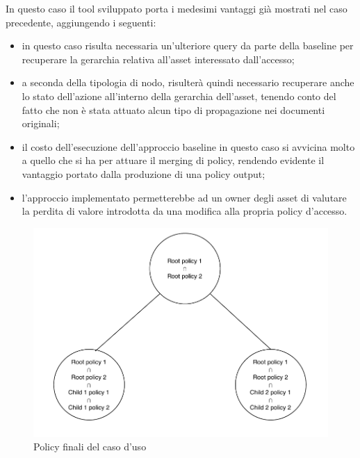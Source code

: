 \documentclass[12pt,a4paper,twoside]{book}
\begin{document}
In questo caso il tool sviluppato porta i medesimi vantaggi già mostrati nel caso precedente, aggiungendo i seguenti:
\begin{itemize}
\item in questo caso risulta necessaria un'ulteriore query da parte della baseline per recuperare la gerarchia relativa all'asset interessato dall'accesso;
\item a seconda della tipologia di nodo, risulterà quindi necessario recuperare anche lo stato dell'azione all'interno della gerarchia dell'asset, tenendo conto del fatto che non è stata attuato alcun tipo di propagazione nei documenti originali;
\item il costo dell'esecuzione dell'approccio baseline in questo caso si avvicina molto a quello che si ha per attuare il merging di policy, rendendo evidente il vantaggio portato dalla produzione di una policy output;
\item l'approccio implementato permetterebbe ad un owner degli asset di valutare la perdita di valore introdotta da una modifica alla propria policy d'accesso.
\end{itemize}
\begin{figure}[H]
\centering
\includegraphics[scale=.50]{../immagini/treePolicyExample.pdf}
\caption{Policy finali del caso d'uso}
\label{treeExampleImg}
\end{figure}
\end{document}
